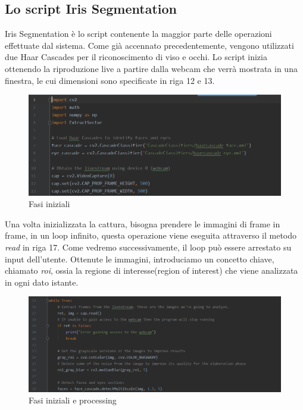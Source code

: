 \subsection{Lo script Iris Segmentation}
Iris Segmentation è lo script contenente la maggior parte delle operazioni effettuate dal sistema. Come già accennato precedentemente, vengono utilizzati due Haar Cascades per il riconoscimento di viso e occhi. 
Lo script inizia ottenendo la riproduzione live a partire dalla webcam che verrà mostrata in una finestra, le cui dimensioni sono specificate in riga 12 e 13.

\begin{figure}[h!]
	\centering
	\includegraphics[width=120mm]{img/5/codice_1_1}
	\caption{\fontsize{10px}{0mm}\selectfont Fasi iniziali\label{fig:codice_1_1}}
\end{figure}

Una volta inizializzata la cattura, bisogna prendere le immagini di frame in frame, in un loop infinito, questa operazione viene eseguita attraverso il metodo \emph{read} in riga 17. Come vedremo successivamente, il loop può essere arrestato su input dell'utente.
Ottenute le immagini, introduciamo un concetto chiave, chiamato \emph{roi}, ossia la regione di interesse(region of interest) che viene analizzata in ogni dato istante.
\begin{figure}[h!]
	\centering
	\includegraphics[width=120mm]{img/5/codice_1_2}
	\caption{\fontsize{10px}{0mm}\selectfont Fasi iniziali e processing \label{fig:codice_1_2}}
\end{figure}\newpage

